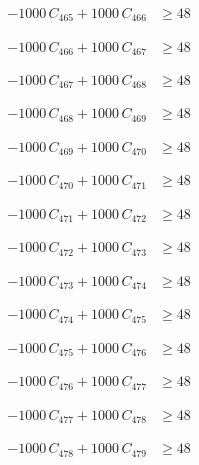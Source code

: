 \documentclass[a4paper,11pt]{article}
\begin{document}
\begin{align}
-1000\,C_{465} + 1000\,C_{466} &\geq 48 \nonumber
\end{align}

\begin{align}
-1000\,C_{466} + 1000\,C_{467} &\geq 48 \nonumber
\end{align}

\begin{align}
-1000\,C_{467} + 1000\,C_{468} &\geq 48 \nonumber
\end{align}

\begin{align}
-1000\,C_{468} + 1000\,C_{469} &\geq 48 \nonumber
\end{align}

\begin{align}
-1000\,C_{469} + 1000\,C_{470} &\geq 48 \nonumber
\end{align}

\begin{align}
-1000\,C_{470} + 1000\,C_{471} &\geq 48 \nonumber
\end{align}

\begin{align}
-1000\,C_{471} + 1000\,C_{472} &\geq 48 \nonumber
\end{align}

\begin{align}
-1000\,C_{472} + 1000\,C_{473} &\geq 48 \nonumber
\end{align}

\begin{align}
-1000\,C_{473} + 1000\,C_{474} &\geq 48 \nonumber
\end{align}

\begin{align}
-1000\,C_{474} + 1000\,C_{475} &\geq 48 \nonumber
\end{align}

\begin{align}
-1000\,C_{475} + 1000\,C_{476} &\geq 48 \nonumber
\end{align}

\begin{align}
-1000\,C_{476} + 1000\,C_{477} &\geq 48 \nonumber
\end{align}

\begin{align}
-1000\,C_{477} + 1000\,C_{478} &\geq 48 \nonumber
\end{align}

\begin{align}
-1000\,C_{478} + 1000\,C_{479} &\geq 48 \nonumber
\end{align}
\end{document}
